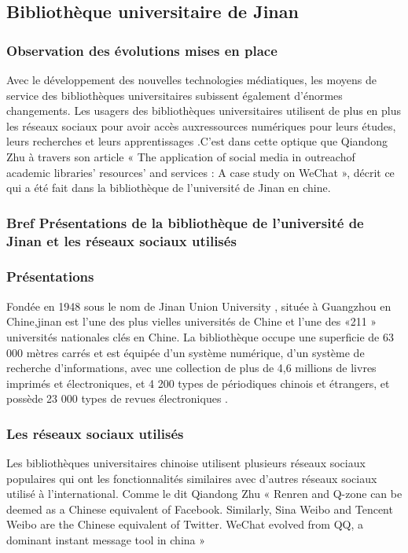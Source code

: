 \documentclass[a4paper,11pt]{article} %
\begin{document}
\subsection{Bibliothèque universitaire de Jinan}

\subsubsection{ Observation des évolutions mises en place}

Avec le développement des nouvelles technologies médiatiques, les moyens de service des bibliothèques universitaires subissent également d’énormes changements. Les usagers des bibliothèques universitaires utilisent de plus en plus les réseaux sociaux pour avoir accès auxressources numériques pour leurs études, leurs recherches et leurs apprentissages \citep{harrison2017social,}.C’est dans cette optique que Qiandong Zhu à travers son article « The application of social media in outreachof academic libraries' resources' and services : A case study on WeChat », décrit ce qui a été fait dans la bibliothèque de l’université de Jinan en chine.

\subsubsection{Bref Présentations de la bibliothèque de l'université de Jinan et les réseaux sociaux utilisés}

\subsubsection{ Présentations}

Fondée en 1948 sous le nom de Jinan Union University , située à Guangzhou en Chine,jinan est l'une des plus vielles universités de Chine et l'une des «211 » universités nationales clés en Chine. La bibliothèque occupe une superficie de 63 000 mètres carrés et est équipée d’un système numérique, d’un système de recherche d’informations, avec une collection de plus de 4,6 millions de livres imprimés et électroniques, et 4 200 types de périodiques chinois et 
étrangers, et possède 23 000 types de revues électroniques \citep{koopman2007world,}.

\subsubsection{ Les réseaux sociaux utilisés}

Les bibliothèques universitaires chinoise utilisent plusieurs réseaux sociaux populaires qui ont les fonctionnalités similaires avec d’autres réseaux sociaux utilisé à l’international. Comme le dit Qiandong Zhu « Renren and Q-zone can be deemed as a Chinese equivalent of Facebook. Similarly, Sina Weibo and Tencent Weibo are the Chinese equivalent of Twitter. WeChat evolved from QQ, a dominant instant message tool in china » \citep{application zhu2016,} \newpage
\end{document}
